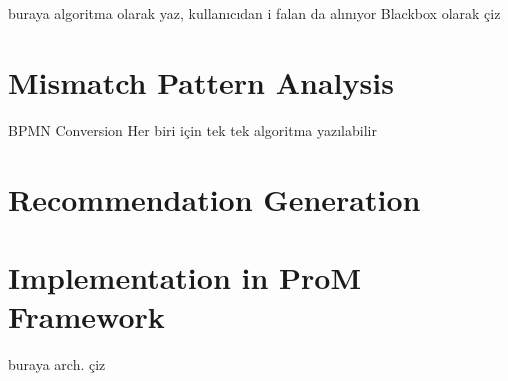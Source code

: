 	buraya algoritma olarak yaz, kullanıcıdan i falan da alınıyor
	Blackbox olarak çiz
	

\section{Mismatch Pattern Analysis}
\label{sec:mismatch-pattern-analysis}
BPMN Conversion
Her biri için tek tek algoritma yazılabilir


\section{Recommendation Generation}
\label{sec:recommendation-generation}



\section{Implementation in ProM Framework}
\label{sec:implementation}
buraya arch. çiz
